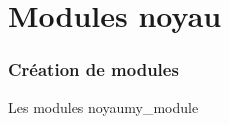 %
%

\part{Modules noyau}

\begin{frame}
  \partpage
\end{frame}

\begin{frame}
  \tableofcontents[currentpart]
\end{frame}

\section{Création de modules}

\begin{frame}[fragile=singleslide]{Les modules noyau}{my\_module}
  
\end{frame}

